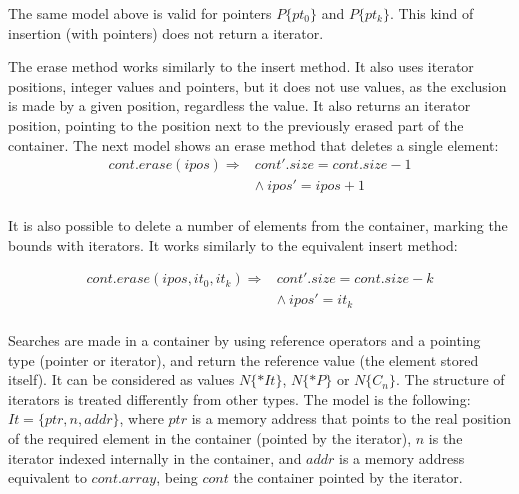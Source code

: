 \documentclass[a4paper]{llncs}
\begin{document}
The same model above is valid for pointers $P\{pt_0\}$ and $P\{pt_k\}$.
This kind of insertion (with pointers) does not return a iterator.

The erase method works similarly to the insert method. It also uses iterator
positions, integer values and pointers, but it does not use values, as the exclusion
is made by a given position, regardless the value. It also returns an iterator position,
pointing to the position next to the previously erased part of the container.
The next model shows an erase method that deletes a single element:
%
\[\begin{array}{ll}
\label{erase1-model}
cont.erase (ipos) \Longrightarrow & cont'.size = cont.size - 1\\
  & \wedge \: ipos' = ipos + 1 \\
\end{array}\]

It is also possible to delete a number of elements from the container,
marking the bounds with iterators. It works similarly to the equivalent
insert method:

\[\begin{array}{ll}
\label{erase2-model}
cont.erase (ipos, it_0, it_k) \Longrightarrow & 	cont'.size = cont.size - k\\
  & \wedge \:	ipos' = it_k \\
\end{array}\]

Searches are made in a container by using reference operators
and a pointing type (pointer or iterator), and return the reference
value (the element stored itself). It can be considered as values
$N\{*It\}$, $N\{*P\}$ or $N\{C_n\}$.	The structure of iterators
is treated differently from other types. The model is the following:
$It = \{ ptr, n, addr\}$,
where $ptr$ is a memory address that points to the
real position of the required element in the container
(pointed by the iterator), $n$ is the iterator indexed
internally in the container, and $addr$ is a memory
address equivalent to $cont.array$, being $cont$ the container
pointed by the iterator.
\end{document}
